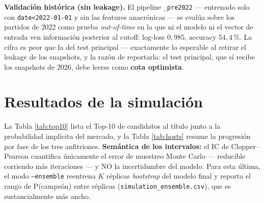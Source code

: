 \documentclass[conference]{IEEEtran}
\begin{document}
\textbf{Validaci\'on hist\'orica (sin leakage).} El pipeline
\texttt{\_pre2022} --- entrenado solo con \texttt{date<2022-01-01} y sin
las features anacr\'onicas --- se eval\'ua sobre los partidos de 2022
como prueba \emph{out-of-time} en la que ni el modelo ni el vector de
entrada ven informaci\'on posterior al cutoff: log-loss $0{,}985$,
accuracy $54{,}4\,\%$. La cifra es peor que la del test principal ---
exactamente lo esperable al retirar el leakage de los snapshots, y la
raz\'on de reportarla: el test principal, que s\'i recibe los snapshots
de 2026, debe leerse como \textbf{cota optimista}.

\section{Resultados de la simulaci\'on}
\label{sec:results}

La Tabla \ref{tab:top10} lista el Top-10 de candidatos al t\'itulo junto a
la probabilidad impl\'icita del mercado, y la Tabla \ref{tab:hosts} resume
la progresi\'on por fase de los tres anfitriones. \textbf{Semántica de los
intervalos:} el IC de Clopper--Pearson cuantifica \'unicamente el error
de muestreo Monte Carlo --- reducible corriendo m\'as iteraciones --- y
NO la incertidumbre del modelo. Para esta \'ultima, el modo
\texttt{--ensemble} reentrena $K$ r\'eplicas \emph{bootstrap} del modelo
final y reporta el rango de P(campe\'on) entre r\'eplicas
(\texttt{simulation\_ensemble.csv}), que es sustancialmente m\'as ancho.
\end{document}
